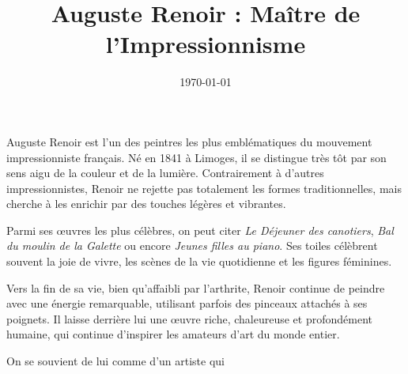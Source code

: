 \documentclass{article}
\title{Auguste Renoir : Maître de l’Impressionnisme}
\author{}
\date{\today}
\begin{document}
\maketitle

Auguste Renoir est l’un des peintres les plus emblématiques du mouvement impressionniste français. Né en 1841 à Limoges, il se distingue très tôt par son sens aigu de la couleur et de la lumière. Contrairement à d'autres impressionnistes, Renoir ne rejette pas totalement les formes traditionnelles, mais cherche à les enrichir par des touches légères et vibrantes.

Parmi ses œuvres les plus célèbres, on peut citer \emph{Le Déjeuner des canotiers}, \emph{Bal du moulin de la Galette} ou encore \emph{Jeunes filles au piano}. Ses toiles célèbrent souvent la joie de vivre, les scènes de la vie quotidienne et les figures féminines.

Vers la fin de sa vie, bien qu'affaibli par l'arthrite, Renoir continue de peindre avec une énergie remarquable, utilisant parfois des pinceaux attachés à ses poignets. Il laisse derrière lui une œuvre riche, chaleureuse et profondément humaine, qui continue d’inspirer les amateurs d’art du monde entier.

On se souvient de lui comme d'un artiste qui 
\end{document}
